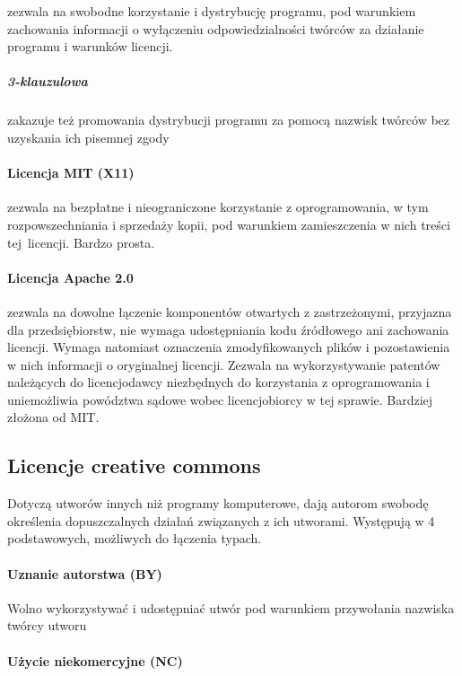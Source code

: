 \documentclass{article}
\begin{document}
zezwala na swobodne korzystanie i dystrybucję programu, pod warunkiem zachowania informacji o wyłączeniu odpowiedzialności twórców za działanie programu i warunków licencji.

\subparagraph{3-klauzulowa}

zakazuje też promowania dystrybucji programu za pomocą nazwisk twórców bez uzyskania ich pisemnej zgody

\paragraph{Licencja MIT (X11)}

zezwala na bezpłatne i nieograniczone korzystanie z oprogramowania, w tym rozpowszechniania i sprzedaży kopii, pod warunkiem zamieszczenia w nich treści tej~licencji. Bardzo prosta.

\paragraph{Licencja Apache 2.0}

zezwala na dowolne łączenie komponentów otwartych z zastrzeżonymi, przyjazna dla przedsiębiorstw, nie wymaga udostępniania kodu źródłowego ani zachowania licencji. Wymaga natomiast oznaczenia zmodyfikowanych plików i pozostawienia w nich informacji o oryginalnej licencji. Zezwala na wykorzystywanie patentów należących do licencjodawcy niezbędnych do korzystania z oprogramowania i uniemożliwia powództwa sądowe wobec licencjobiorcy w tej sprawie. Bardziej złożona od MIT.

\subsection{Licencje creative commons}

Dotyczą utworów innych niż programy komputerowe, dają autorom swobodę określenia dopuszczalnych działań związanych z ich utworami. Występują w 4 podstawowych, możliwych do łączenia typach.

\paragraph{Uznanie autorstwa (BY)}

Wolno wykorzystywać i udostępniać utwór pod warunkiem przywołania nazwiska twórcy utworu

\paragraph{Użycie niekomercyjne (NC)}
\end{document}
